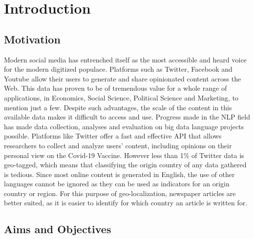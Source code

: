 \chapter{Introduction}


\section{Motivation} %

Modern social media has entrenched itself as the most accessible and heard voice for the modern digitized populace.
Platforms such as Twitter, Facebook and Youtube allow their users to generate and share opinionated content across the Web.
This data has proven to be of tremendous value for a whole range of applications, in Economics, Social Science, Political Science and Marketing, to mention just a few.
Despite such advantages, the scale of the content in this available data makes it difficult to access and use.
Progress made in the \ac{NLP} field has made data collection, analyses and evaluation on big data language projects possible.
Platforms like Twitter offer a fast and effective \ac{API} that allows researchers to collect and analyze users' content, including opinions on their personal view on the Covid-19 Vaccine.
However less than 1\% of Twitter data is geo-tagged, which means that classifying the origin country of any data gathered is tedious.
Since most online content is generated in English, the use of other languages cannot be ignored as they can be used as indicators for an origin country or region.
For this purpose of geo-localization, newspaper articles are better suited, as it is easier to identify for which country an article is written for.



\section{Aims and Objectives}

